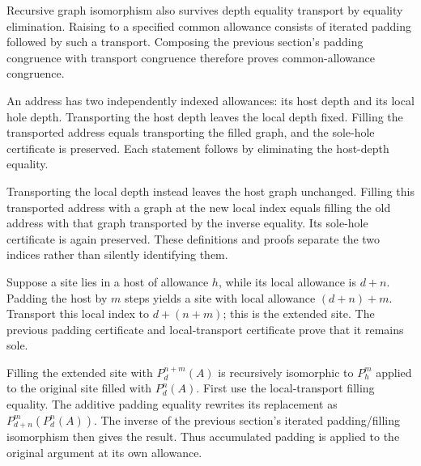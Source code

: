 Recursive graph isomorphism also survives depth equality transport by equality
elimination. Raising to a specified common allowance consists of iterated
padding followed by such a transport. Composing the previous section's padding
congruence with transport congruence therefore proves common-allowance
congruence.





An address has two independently indexed allowances: its host depth and its
local hole depth. Transporting the host depth leaves the local depth fixed.
Filling the transported address equals transporting the filled graph, and the
sole-hole certificate is preserved. Each statement follows by eliminating
the host-depth equality.

Transporting the local depth instead leaves the host graph unchanged. Filling
this transported address with a graph at the new local index equals filling
the old address with that graph transported by the inverse equality. Its
sole-hole certificate is again preserved. These definitions and proofs
separate the two indices rather than silently identifying them.








Suppose a site lies in a host of allowance $h$, while its local allowance is
$d+n$. Padding the host by $m$ steps yields a site with local allowance
$(d+n)+m$. Transport this local index to $d+(n+m)$; this is the extended site.
The previous padding certificate and local-transport certificate prove that
it remains sole.

Filling the extended site with $P_d^{n+m}(A)$ is recursively isomorphic to
$P_h^m$ applied to the original site filled with $P_d^n(A)$. First use the
local-transport filling equality. The additive padding equality rewrites its
replacement as $P_{d+n}^m(P_d^n(A))$. The inverse of the previous section's
iterated padding/filling isomorphism then gives the result. Thus accumulated
padding is applied to the original argument at its own allowance.


